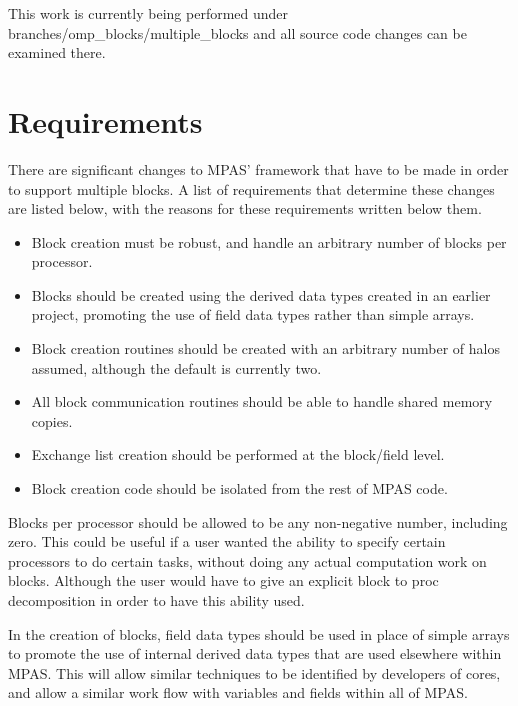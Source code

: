 \documentclass[11pt]{report}
\begin{document}
This work is currently being performed under
branches/omp\_blocks/multiple\_blocks and all source code changes can be
examined there.

%
%
\chapter{Requirements}

There are significant changes to MPAS' framework that have to be made in order
to support multiple blocks. A list of requirements that determine these changes
are listed below, with the reasons for these requirements written below them.

\begin{itemize}
	\item Block creation must be robust, and handle an arbitrary number
		of blocks per processor.

	\item Blocks should be created using the derived data types created in an
		earlier project, promoting the use of field data types rather than
		simple arrays.

	\item Block creation routines should be created with an arbitrary number of
		halos assumed, although the default is currently two.

	\item All block communication routines should be able to handle shared
		memory copies.

	\item Exchange list creation should be performed at the block/field level.

	\item Block creation code should be isolated from the rest of MPAS code.
\end{itemize}

Blocks per processor should be allowed to be any non-negative number, including
zero. This could be useful if a user wanted the ability to specify certain
processors to do certain tasks, without doing any actual computation work on
blocks. Although the user would have to give an explicit block to proc
decomposition in order to have this ability used.

In the creation of blocks, field data types should be used in place of simple
arrays to promote the use of internal derived data types that are used
elsewhere within MPAS. This will allow similar techniques to be identified by
developers of cores, and allow a similar work flow with variables and fields
within all of MPAS.
\end{document}
